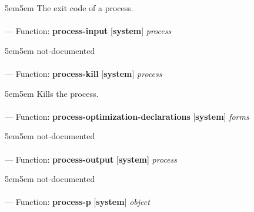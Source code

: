 \begin{adjustwidth}{5em}{5em}
The exit code of a process.
\end{adjustwidth}

\paragraph{}
\label{SYSTEM:PROCESS-INPUT}
--- Function: \textbf{process-input} [\textbf{system}] \textit{process}

\begin{adjustwidth}{5em}{5em}
not-documented
\end{adjustwidth}

\paragraph{}
\label{SYSTEM:PROCESS-KILL}
--- Function: \textbf{process-kill} [\textbf{system}] \textit{process}

\begin{adjustwidth}{5em}{5em}
Kills the process.
\end{adjustwidth}

\paragraph{}
\label{SYSTEM:PROCESS-OPTIMIZATION-DECLARATIONS}
--- Function: \textbf{process-optimization-declarations} [\textbf{system}] \textit{forms}

\begin{adjustwidth}{5em}{5em}
not-documented
\end{adjustwidth}

\paragraph{}
\label{SYSTEM:PROCESS-OUTPUT}
--- Function: \textbf{process-output} [\textbf{system}] \textit{process}

\begin{adjustwidth}{5em}{5em}
not-documented
\end{adjustwidth}

\paragraph{}
\label{SYSTEM:PROCESS-P}
--- Function: \textbf{process-p} [\textbf{system}] \textit{object}

